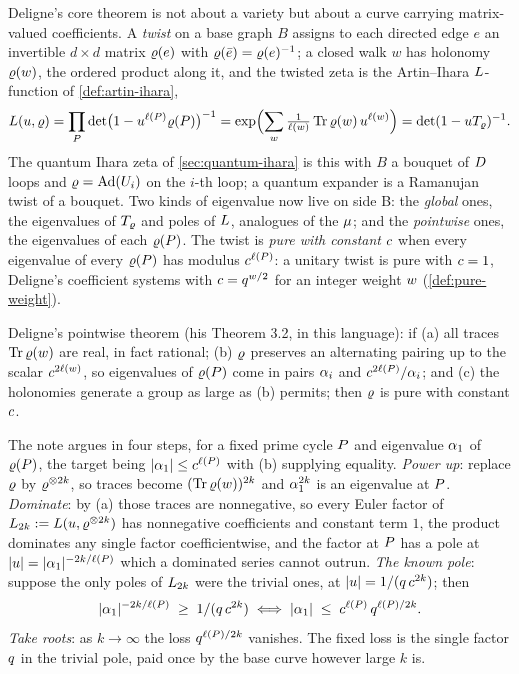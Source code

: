 Deligne's core theorem is not about a variety but about a curve carrying matrix-valued coefficients. A
\emph{twist} on a base graph $B$ assigns to each directed edge $e$ an invertible $d\times d$ matrix
$\varrho(e)$ with $\varrho(\bar{e}) = \varrho(e)^{-1}$; a closed walk $w$ has holonomy $\varrho(w)$, the ordered
product along it, and the twisted zeta is the Artin--Ihara $L$-function of \cref{def:artin-ihara},
\[
L(u,\varrho) = \prod_{P}\det\bigl(1-u^{\ell(P)}\varrho(P)\bigr)^{-1} =
\exp\Bigl(\sum_{w}\tfrac{1}{\ell(w)}\operatorname{Tr}\varrho(w)\,u^{\ell(w)}\Bigr) = \det(1-uT_{\varrho})^{-1}.
\]
The quantum Ihara zeta of \cref{sec:quantum-ihara} is this with $B$ a bouquet of $D$ loops and $\varrho =
\operatorname{Ad}(U_{i})$ on the $i$-th loop; a quantum expander is a Ramanujan twist of a bouquet. Two kinds of
eigenvalue now live on side B: the \emph{global} ones, the eigenvalues of $T_{\varrho}$ and poles of
$L$, analogues of the $\mu$; and the \emph{pointwise} ones, the eigenvalues of each
$\varrho(P)$. The twist is \emph{pure with constant $c$} when every eigenvalue of every
$\varrho(P)$ has modulus $c^{\ell(P)}$: a unitary twist is pure with $c=1$, Deligne's
coefficient systems with $c = q^{w/2}$ for an integer weight $w$ (\cref{def:pure-weight}).

Deligne's pointwise theorem (his Theorem 3.2, in this language): if (a) all traces $\operatorname{Tr}\varrho(w)$ are real, in
fact rational; (b) $\varrho$ preserves an alternating pairing up to the scalar $c^{2\ell(w)}$, so
eigenvalues of $\varrho(P)$ come in pairs $\alpha_{i}$ and $c^{2\ell(P)}/\alpha_{i}$; and (c)
the holonomies generate a group as large as (b) permits; then $\varrho$ is pure with constant $c$.

The note argues in four steps, for a fixed prime cycle $P$ and eigenvalue $\alpha_{1}$ of
$\varrho(P)$, the target being $|\alpha_{1}| \le c^{\ell(P)}$ with (b) supplying equality.
\emph{Power up}: replace $\varrho$ by $\varrho^{\otimes2k}$, so traces become $(\operatorname{Tr}\varrho(w))^{2k}$ and
$\alpha_{1}^{2k}$ is an eigenvalue at $P$. \emph{Dominate}: by (a) those traces are nonnegative, so
every Euler factor of $L_{2k} := L(u,\varrho^{\otimes2k})$ has nonnegative coefficients and
constant term $1$, the product dominates any single factor coefficientwise, and the factor at $P$ has
a pole at $|u| = |\alpha_{1}|^{-2k/\ell(P)}$ which a dominated series cannot outrun. \emph{The known
pole}: suppose the only poles of $L_{2k}$ were the trivial ones, at $|u| = 1/(q\,c^{2k})$;
then
\[
|\alpha_{1}|^{-2k/\ell(P)} \;\ge\; 1/(q\,c^{2k}) \iff |\alpha_{1}| \;\le\;
c^{\ell(P)}\,q^{\ell(P)/2k}.
\]
\emph{Take roots}: as $k\to\infty$ the loss $q^{\ell(P)/2k}$ vanishes. The fixed loss is the single
factor $q$ in the trivial pole, paid once by the base curve however large $k$ is.

